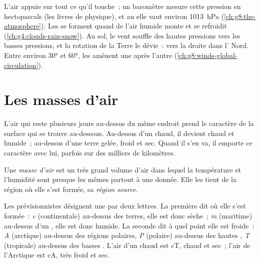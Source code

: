 \begin{recall}
L'air appuie sur tout ce qu'il touche~; un baromètre mesure cette pression
en hectopascals (les livres de physique), et au  elle vaut
environ \qty{1013}{hPa} (\cref{ch:g8:the-atmosphere}). Les  se
forment quand de l'air humide monte et se refroidit
(\cref{ch:g4:clouds-rain-snow}). Au sol, le vent souffle des hautes
pressions vers les basses pressions, et la rotation de la Terre le
dévie~: vers la droite dans l' Nord. Entre environ \ang{30} et
\ang{60}, les  amènent une  après l'autre
(\cref{ch:g8:winds-global-circulation}).
\end{recall}

\section{Les masses d'air}

L'air qui reste plusieurs jours au-dessus du même endroit prend le
caractère de la surface qui se trouve au-dessous. Au-dessus d'un 
chaud, il devient chaud et humide~; au-dessus d'une terre gelée, froid et
sec. Quand il s'en va, il emporte ce caractère avec lui, parfois sur des
milliers de kilomètres.

\begin{definition}\label{def:g8:fronts-and-weather-maps:air-mass}
Une \emph{masse d'air} est un très grand volume d'air
dans lequel la température et l'humidité sont presque les mêmes partout à
une  donnée. Elle les tient de la région où elle s'est formée, sa
\emph{région source}.
\end{definition}

Les prévisionnistes désignent une  par deux lettres. La
première dit où elle s'est formée~: \emph{c} (continentale) au-dessus des
terres, elle est donc sèche~; \emph{m} (maritime) au-dessus d'un ,
elle est donc humide. La seconde dit à quel point elle est froide~:
\emph{A} (arctique) au-dessus des régions polaires, \emph{P} (polaire)
au-dessus des hautes , \emph{T} (tropicale) au-dessus des basses
. L'air d'un  chaud est cT, chaud et sec~; l'air de
l'Arctique est cA, très froid et sec.

